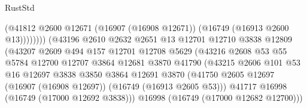 \begin{lexlean}{RustStd}
\begin{coremodule}
                                            (@41812
                                              @2600
                                              @12671
                                              (@16907 (@16908 @12671))
                                              (@16749 (@16913 @2600 @13))))))))
                                  (@43196
                                    @2610
                                    @2632
                                    @2651
                                    @13
                                    @12701
                                    @12710
                                    @3838
                                    @12809
                                    (@43207
                                      @2609
                                      @494
                                      @157
                                      @12701
                                      @12708
                                      @5629
                                      (@43216
                                        @2608
                                        @53
                                        @55
                                        @5784
                                        @12700
                                        @12707
                                        @3864
                                        @12681
                                        @3870
                                        @41790
                                        (@43215
                                          @2606
                                          @101
                                          @53
                                          @16
                                          @12697
                                          @3838
                                          @3850
                                          @3864
                                          @12691
                                          @3870
                                          (@41750
                                            @2605
                                            @12697
                                            (@16907 (@16908 @12697))
                                            (@16749 (@16913 @2605 @53)))
                                          @41717
                                          @16998
                                          (@16749 (@17000 @12692 @3838)))
                                        @16998
                                        (@16749 (@17000 @12682 @12700)))

\end{coremodule}
\end{lexlean}

